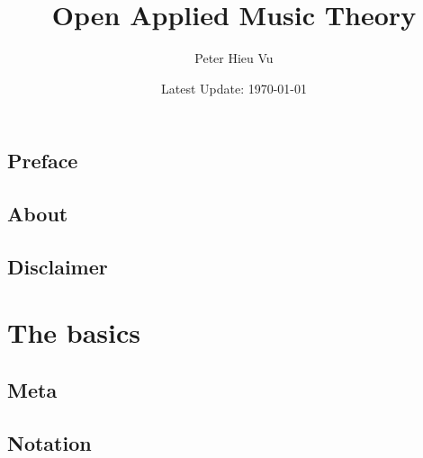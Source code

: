 \documentclass[12pt]{book}
\title{Open Applied Music Theory}
\author{Peter Hieu Vu}
\date{Latest Update: \today}
\newcommand\onlyinsubfile[1]{#1}
\newcommand\notinsubfile[1]{}
\begin{document}
    \renewcommand{\onlyinsubfile}[1]{}
    \renewcommand{\notinsubfile}[1]{#1}

    \maketitle

    \frontmatter
    \chapter{Preface}\label{preface}
        

    \chapter{About}\label{about}
        

    \tableofcontents

    \chapter{Disclaimer}\label{disclaimer}
        

    \mainmatter 
    \setcounter{chapter}{-1}
    
    \part{The basics}

        \chapter{Meta}\label{ch0}
            

        \chapter{Notation}\label{ch1}
            
\end{document}
